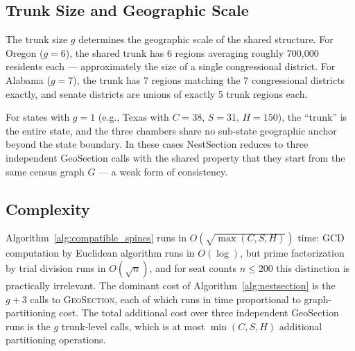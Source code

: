 \subsection{Trunk Size and Geographic Scale}

The trunk size $g$ determines the geographic scale of the shared structure.
For Oregon ($g = 6$), the shared trunk has 6 regions averaging roughly 700,000
residents each --- approximately the size of a single congressional district.
For Alabama ($g = 7$), the trunk has 7 regions matching the 7 congressional
districts exactly, and senate districts are unions of exactly 5 trunk regions
each.

For states with $g = 1$ (e.g., Texas with $C=38$, $S=31$, $H=150$), the
``trunk'' is the entire state, and the three chambers share no sub-state
geographic anchor beyond the state boundary.  In these cases NestSection
reduces to three independent GeoSection calls with the shared property that
they start from the same census graph $G$ --- a weak form of consistency.

\subsection{Complexity}

Algorithm~\ref{alg:compatible_spines} runs in $O(\sqrt{\max(C,S,H)})$ time:
GCD computation by Euclidean algorithm runs in $O(\log)$, but prime
factorization by trial division runs in $O(\sqrt{n})$, and for seat counts
$n \leq 200$ this distinction is practically irrelevant.
The dominant cost of
Algorithm~\ref{alg:nestsection} is the $g+3$ calls to \textsc{GeoSection},
each of which runs in time proportional to graph-partitioning cost.  The
total additional cost over three independent GeoSection runs is the $g$
trunk-level calls, which is at most $\min(C,S,H)$ additional partitioning
operations.
